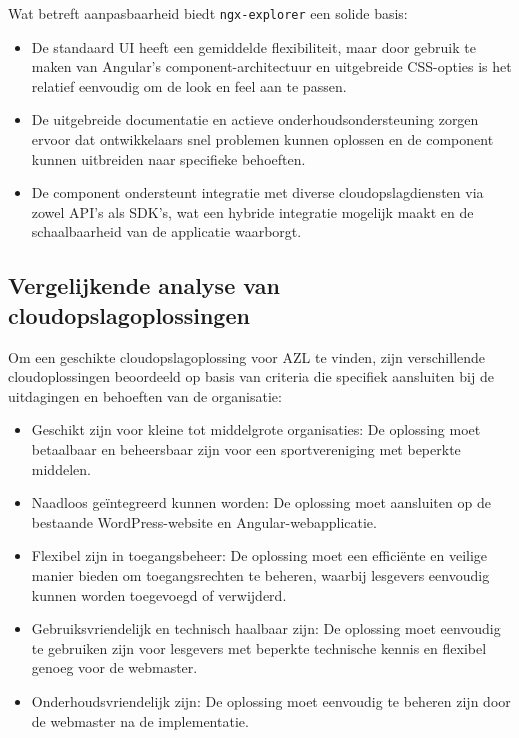 Wat betreft aanpasbaarheid biedt \texttt{ngx-explorer} een solide basis:
\begin{itemize}
  \item De standaard UI heeft een gemiddelde flexibiliteit, maar door gebruik te maken van Angular's component-architectuur en uitgebreide CSS-opties is het relatief eenvoudig om de look en feel aan te passen.
  \item De uitgebreide documentatie en actieve onderhoudsondersteuning zorgen ervoor dat ontwikkelaars snel problemen kunnen oplossen en de component kunnen uitbreiden naar specifieke behoeften.
  \item De component ondersteunt integratie met diverse cloudopslagdiensten via zowel API's als SDK's, wat een hybride integratie mogelijk maakt en de schaalbaarheid van de applicatie waarborgt.
\end{itemize}



\subsection{Vergelijkende analyse van cloudopslagoplossingen}
Om een geschikte cloudopslagoplossing voor AZL te vinden, zijn verschillende cloudoplossingen beoordeeld op basis van criteria die specifiek aansluiten bij de uitdagingen en behoeften van de organisatie:
\begin{itemize}
    \item Geschikt zijn voor kleine tot middelgrote organisaties: De oplossing moet betaalbaar en beheersbaar zijn voor een sportvereniging met beperkte middelen.
    \item Naadloos geïntegreerd kunnen worden: De oplossing moet aansluiten op de bestaande WordPress-website en Angular-webapplicatie.
    \item Flexibel zijn in toegangsbeheer: De oplossing moet een efficiënte en veilige manier bieden om toegangsrechten te beheren, waarbij lesgevers eenvoudig kunnen worden toegevoegd of verwijderd.
    \item Gebruiksvriendelijk en technisch haalbaar zijn: De oplossing moet eenvoudig te gebruiken zijn voor lesgevers met beperkte technische kennis en flexibel genoeg voor de webmaster.
    \item Onderhoudsvriendelijk zijn: De oplossing moet eenvoudig te beheren zijn door de webmaster na de implementatie.
\end{itemize}

